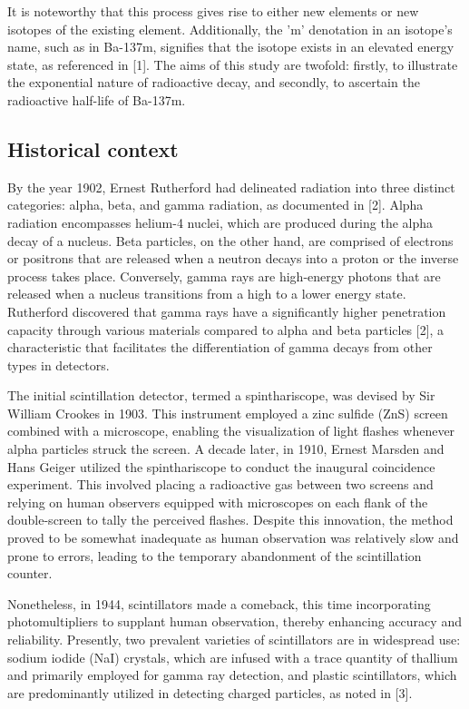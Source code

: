 \documentclass[10pt,letterpaper,onecolumn]{article}
\begin{document}
It is noteworthy that this process gives rise to either new elements or new 
isotopes of the existing element. Additionally, the 'm' denotation in an isotope's 
name, such as in Ba-137m, signifies that the isotope exists in an elevated energy state, 
as referenced in [1]. 
The aims of this study are twofold: 
firstly, to illustrate the exponential nature of radioactive decay, 
and secondly, to ascertain the radioactive half-life of Ba-137m.
\subsection{Historical context}
By the year 1902, Ernest Rutherford had delineated radiation into three 
distinct categories: alpha, beta, and gamma radiation, as documented in [2]. 
Alpha radiation encompasses helium-4 nuclei, which are produced during the alpha 
decay of a nucleus. Beta particles, on the other hand, are comprised of electrons or 
positrons that are released when a neutron decays into a proton or the inverse process 
takes place. Conversely, gamma rays are high-energy photons that are released when a 
nucleus transitions from a high to a lower energy state. Rutherford discovered that gamma
 rays have a significantly higher penetration capacity through various materials 
 compared to alpha and beta particles [2], a characteristic that facilitates the
  differentiation of gamma decays from other types in detectors.

The initial scintillation detector, termed a spinthariscope, was devised by Sir 
William Crookes in 1903. This instrument employed a zinc sulfide (ZnS) screen 
combined with a microscope, enabling the visualization of light flashes whenever 
alpha particles struck the screen. A decade later, in 1910, Ernest Marsden and 
Hans Geiger utilized the spinthariscope to conduct the inaugural coincidence experiment. 
This involved placing a radioactive gas between two screens and relying on human 
observers equipped with microscopes on each flank of the double-screen to tally the 
perceived flashes. Despite this innovation, the method proved to be somewhat 
inadequate as human observation was relatively slow and prone to errors, leading to 
the temporary abandonment of the scintillation counter.

Nonetheless, in 1944, scintillators made a comeback, this time incorporating 
photomultipliers to supplant human observation, thereby enhancing accuracy and 
reliability. Presently, two prevalent varieties of scintillators are in widespread use: 
sodium iodide (NaI) crystals, which are infused with a trace quantity of thallium and 
primarily employed for gamma ray detection, and plastic scintillators, which are 
predominantly utilized in detecting charged particles, as noted in [3].
\end{document}
